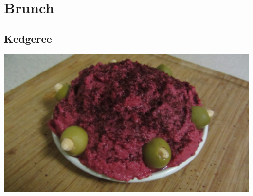 \documentclass{tufte-book}
\begin{document}
\begin{figure}[p]
\hfill
{}
\end{figure}

\chapter{Brunch}
\section{Kedgeree}

\begin{marginfigure}%
  \includegraphics[width=\linewidth]{beetroothummus.png}
\end{marginfigure}
\end{document}
